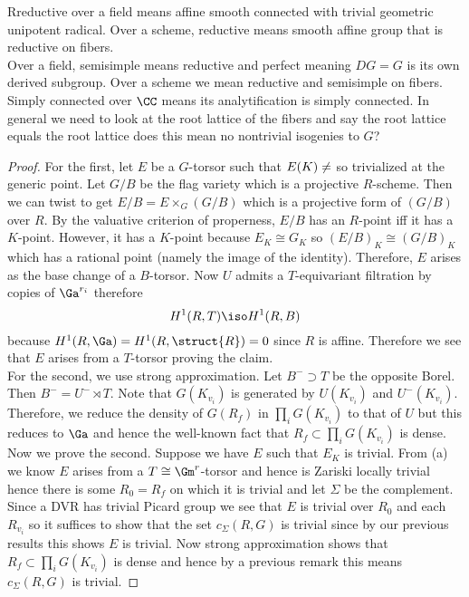 \documentclass{article}
\begin{document}
\begin{rmk}
Rreductive over a field means affine smooth connected with trivial geometric unipotent radical. Over a scheme, reductive means smooth affine group that is reductive on fibers.
\bigskip\\
Over a field, semisimple means reductive and perfect meaning $D G = G$ is its own derived subgroup. Over a scheme we mean reductive and semisimple on fibers.
\bigskip\\
Simply connected over $\CC$ means its analytification is simply connected. In general we need to look at the root lattice of the fibers and say the root lattice equals the root lattice does this mean no nontrivial isogenies to $G$?
\end{rmk}

\begin{proof}
For the first, let $E$ be a $G$-torsor such that $E(K) \neq \empty$ so trivialized at the generic point. Let $G/B$ be the flag variety which is a projective $R$-scheme. Then we can twist to get $E/B = E \times_G (G/B)$ which is a projective form of $(G/B)$ over $R$. By the valuative criterion of properness, $E/B$ has an $R$-point iff it has a $K$-point. However, it has a $K$-point because $E_K \cong G_K$ so $(E/B)_K \cong (G/B)_K$ which has a rational point (namely the image of the identity). Therefore, $E$ arises as the base change of a $B$-torsor. Now $U$ admits a $T$-equivariant filtration by copies of $\Ga^{r_i}$ therefore
\[ H^1(R, T) \iso H^1(R, B) \]
because $H^1(R, \Ga) = H^1(R, \struct{R}) = 0$ since $R$ is affine. Therefore we see that $E$ arises from a $T$-torsor proving the claim. 
\bigskip\\
For the second, we use strong approximation. Let $B^{-} \supset T$ be the opposite Borel. Then $B ^{-} = U^{-} \rtimes T$. Note that $G(K_{v_i})$ is generated by $U(K_{v_i})$ and $U^{-}(K_{v_i})$. Therefore, we reduce the density of $G(R_f)$ in $\prod_i G(K_{v_i})$ to that of $U$ but this reduces to $\Ga$ and hence the well-known fact that $R_f \subset \prod_i G(K_{v_i})$ is dense. 
\bigskip\\
Now we prove the second. Suppose we have $E$ such that $E_K$ is trivial. From (a) we know $E$ arises from a $T \cong \Gm^r$-torsor and hence is Zariski locally trivial hence there is some $R_0 = R_f$ on which it is trivial and let $\Sigma$ be the complement. Since a DVR has trivial Picard group we see that $E$ is trivial over $R_0$ and each $R_{v_i}$ so it suffices to show that the set $c_{\Sigma}(R, G)$ is trivial since by our previous results this shows $E$ is trivial. Now strong approximation shows that $R_f \subset \prod_i G(K_{v_i})$ is dense and hence by a previous remark this means $c_{\Sigma}(R, G)$ is trivial. 
\end{proof}
\end{document}
